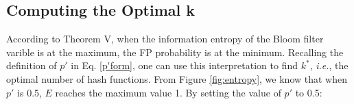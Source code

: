 %



%
%



\subsection{Computing the Optimal k}

According to Theorem V, when the information entropy of the Bloom filter varible is at the maximum, the FP probability is at the minimum. Recalling the definition of $p'$ in Eq. \ref{p'form}, one can use this interpretation to find $k^*$, \textit{i.e.}, the optimal number of hash functions. From Figure \ref{fig:entropy}, we know that when $p'$ is 0.5, $E$ reaches the maximum value 1. By setting  the value of $p'$ to 0.5:




